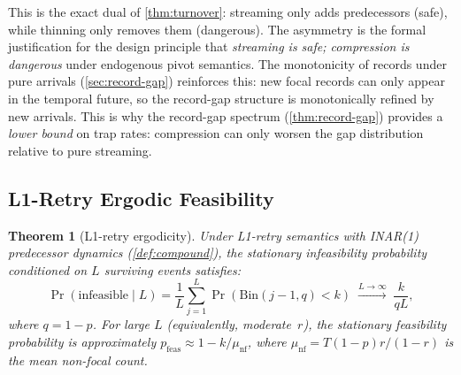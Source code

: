\documentclass[11pt]{article}
\theoremstyle{plain}
\newtheorem{theorem}{Theorem}[section]
\theoremstyle{definition}
\theoremstyle{remark}
\newcommand{\pfeas}{{p_{\mathrm{feas}}}}
\begin{document}
This is the exact dual of \cref{thm:turnover}: streaming only adds
predecessors (safe), while thinning only removes them (dangerous).
The asymmetry is the formal justification for the design principle
that \emph{streaming is safe; compression is dangerous} under
endogenous pivot semantics.  The monotonicity of records under pure
arrivals (\cref{sec:record-gap}) reinforces this: new focal records
can only appear in the temporal future, so the record-gap structure is
monotonically refined by new arrivals.  This is why the record-gap
spectrum (\cref{thm:record-gap}) provides a \emph{lower bound} on
trap rates: compression can only worsen the gap distribution relative
to pure streaming.

\subsection{L1-Retry Ergodic Feasibility}

\begin{theorem}[L1-retry ergodicity]\label{thm:l1-retry}
Under L1-retry semantics with INAR(1) predecessor dynamics
(\cref{def:compound}), the stationary infeasibility probability
conditioned on $L$ surviving events satisfies:
\begin{equation}\label{eq:pfeas}
  \Pr(\text{infeasible} \mid L)
  = \frac{1}{L} \sum_{j=1}^{L} \Pr(\mathrm{Bin}(j{-}1, q) < k)
  \;\xrightarrow{L \to \infty}\; \frac{k}{qL},
\end{equation}
where $q = 1 - p$.  For large $L$ (equivalently, moderate~$r$), the
stationary feasibility probability is approximately
$\pfeas \approx 1 - k/\mu_{\mathrm{nf}}$, where
$\mu_{\mathrm{nf}} = T(1-p)r/(1-r)$ is the mean non-focal count.
\end{theorem}
\end{document}
